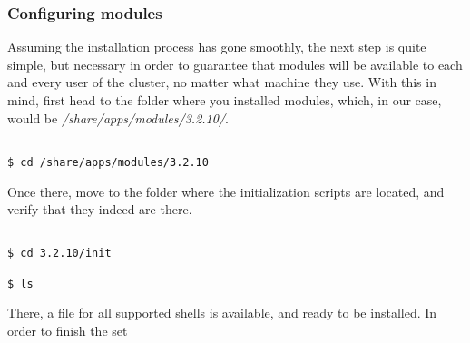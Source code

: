 \documentclass[]{article}
\begin{document}
                                                                                                                    \subsubsection{Configuring modules}
                                                                                                                    Assuming the installation process has gone smoothly, the next step is quite simple, but necessary in order
                                                                                                                    to guarantee that modules will be available to each and every user of the cluster, no matter what machine
                                                                                                                    they use. With this in mind, first head to the folder where you installed modules, which, in our case, 
                                                                                                                    would be \textit{/share/apps/modules/3.2.10/}.
                                                                                                                    \begin{lstlisting}
                                                                                                                    $ cd /share/apps/modules/3.2.10
                                                                                                                    \end{lstlisting}
                                                                                                                    Once there, move to the folder where the initialization scripts are located, and verify that they indeed are
                                                                                                                    there.
                                                                                                                    \begin{lstlisting}
                                                                                                                    $ cd 3.2.10/init
                                                                                                                    $ ls
                                                                                                                    \end{lstlisting}
                                                                                                                    There, a file for all supported shells is available, and ready to be installed. In order to finish the set
\end{document}
